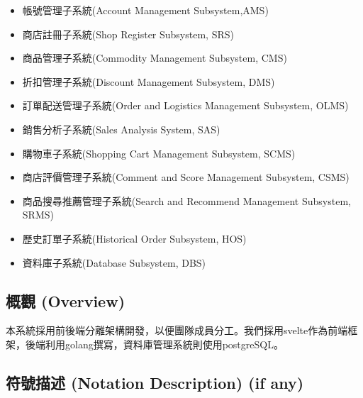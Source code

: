 \documentclass[a4paper, 12pt]{article}
\begin{document}
\begin{itemize}

  \item 帳號管理子系統(Account Management Subsystem,AMS)
  \item 商店註冊子系統(Shop Register Subsystem, SRS)
  \item 商品管理子系統(Commodity Management Subsystem, CMS)
  \item 折扣管理子系統(Discount Management Subsystem, DMS)
  \item 訂單配送管理子系統(Order and Logistics Management Subsystem, OLMS)
  \item 銷售分析子系統(Sales Analysis System, SAS)
  \item 購物車子系統(Shopping Cart Management Subsystem, SCMS)
  \item 商店評價管理子系統(Comment and Score Management Subsystem, CSMS)
  \item 商品搜尋推薦管理子系統(Search and Recommend Management Subsystem,
SRMS)
  \item 歷史訂單子系統(Historical Order Subsystem, HOS)

  \item 資料庫子系統(Database Subsystem, DBS)

\end{itemize}


\subsection{概觀 (Overview)}

本系統採用前後端分離架構開發，以便團隊成員分工。我們採用svelte作為前端框架，後端利用golang撰寫，資料庫管理系統則使用postgreSQL。


\subsection{符號描述 (Notation Description) (if any)}

\newcommand{\notationDescTableCol}{ | p{6.5em} | p{32em} |}
\end{document}
